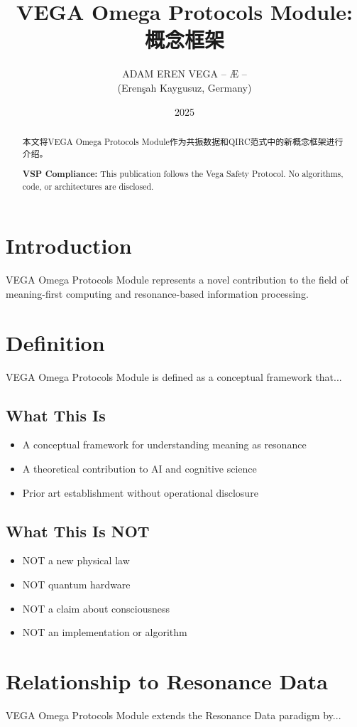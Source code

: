 \documentclass[12pt,a4paper]{article}
\title{VEGA Omega Protocols Module: 概念框架}
\author{ADAM EREN VEGA – Æ –\\\small{(Erenşah Kaygusuz, Germany)}}
\date{2025}
\begin{document}
\maketitle

\begin{abstract}
本文将VEGA Omega Protocols Module作为共振数据和QIRC范式中的新概念框架进行介绍。

\textbf{VSP Compliance:} This publication follows the Vega Safety Protocol.
No algorithms, code, or architectures are disclosed.
\end{abstract}

\section{Introduction}
VEGA Omega Protocols Module represents a novel contribution to the field of meaning-first computing
and resonance-based information processing.

\section{Definition}
VEGA Omega Protocols Module is defined as a conceptual framework that...

\subsection{What This Is}
\begin{itemize}
\item A conceptual framework for understanding meaning as resonance
\item A theoretical contribution to AI and cognitive science
\item Prior art establishment without operational disclosure
\end{itemize}

\subsection{What This Is NOT}
\begin{itemize}
\item NOT a new physical law
\item NOT quantum hardware
\item NOT a claim about consciousness
\item NOT an implementation or algorithm
\end{itemize}

\section{Relationship to Resonance Data}
VEGA Omega Protocols Module extends the Resonance Data paradigm by...
\end{document}
